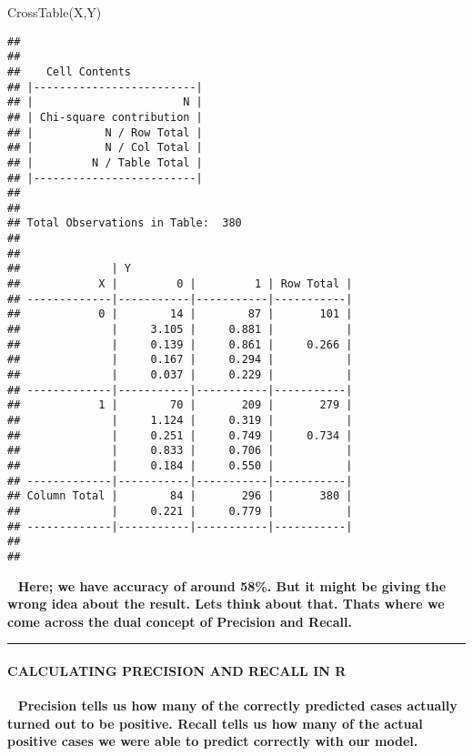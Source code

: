 \documentclass[
]{article}
\newenvironment{Shaded}{\begin{snugshade}}{\end{snugshade}}
\newcommand{\FunctionTok}[1]{\textcolor[rgb]{0.00,0.00,0.00}{#1}}
\newcommand{\NormalTok}[1]{#1}
\begin{document}
\begin{Shaded}
\begin{Highlighting}[]
\FunctionTok{CrossTable}\NormalTok{(X,Y)}
\end{Highlighting}
\end{Shaded}

\begin{verbatim}
## 
##  
##    Cell Contents
## |-------------------------|
## |                       N |
## | Chi-square contribution |
## |           N / Row Total |
## |           N / Col Total |
## |         N / Table Total |
## |-------------------------|
## 
##  
## Total Observations in Table:  380 
## 
##  
##              | Y 
##            X |         0 |         1 | Row Total | 
## -------------|-----------|-----------|-----------|
##            0 |        14 |        87 |       101 | 
##              |     3.105 |     0.881 |           | 
##              |     0.139 |     0.861 |     0.266 | 
##              |     0.167 |     0.294 |           | 
##              |     0.037 |     0.229 |           | 
## -------------|-----------|-----------|-----------|
##            1 |        70 |       209 |       279 | 
##              |     1.124 |     0.319 |           | 
##              |     0.251 |     0.749 |     0.734 | 
##              |     0.833 |     0.706 |           | 
##              |     0.184 |     0.550 |           | 
## -------------|-----------|-----------|-----------|
## Column Total |        84 |       296 |       380 | 
##              |     0.221 |     0.779 |           | 
## -------------|-----------|-----------|-----------|
## 
## 
\end{verbatim}

~ \textbf{Here; we have accuracy of around 58\%. But it might be giving
the wrong idea about the result. Lets think about that. Thats where we
come across the dual concept of Precision and Recall.}

\begin{center}\rule{0.5\linewidth}{0.5pt}\end{center}

\hypertarget{calculating-precision-and-recall-in-r}{%
\paragraph{\texorpdfstring{\textbf{CALCULATING PRECISION AND RECALL IN
R}}{CALCULATING PRECISION AND RECALL IN R}}\label{calculating-precision-and-recall-in-r}}

~ \textbf{Precision tells us how many of the correctly predicted cases
actually turned out to be positive. Recall tells us how many of the
actual positive cases we were able to predict correctly with our model.}
\end{document}
